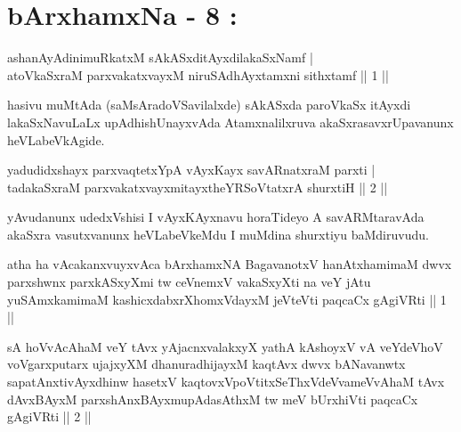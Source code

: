 
\chapter{bArxhamxNa - 8 :}


\begin{shl}
ashanAyAdinimuRkatxM sAkASxditAyxdilakaSxNamf |\\
atoV\s kaSxraM parxvakatxvayxM niruSAdhAyxtamxni sithxtamf \hfill || 1 ||
\end{shl}

\begin{artha}
hasivu muMtAda (saMsAradoVSavilalxde) sAkASxda paroVkaSx itAyxdi lakaSxNavuLaLx upAdhishUnayxvAda Atamxnalilxruva akaSxrasavxrUpavanunx heVLabeVkAgide.
\end{artha}

\begin{shl}
yadudidxshayx parxvaqtetxYpA vAyxKayx savARnatxraM parxti |\\
tadakaSxraM parxvakatxvayxmitayxtheYRSoVtatxrA shurxtiH \hfill || 2 ||
\end{shl}

\begin{artha}
yAvudanunx udedxVshisi I vAyxKAyxnavu horaTideyo A savARMtaravAda akaSxra vasutxvanunx heVLabeVkeMdu I muMdina shurxtiyu baMdiruvudu.
\end{artha}



\begin{kandikeshl}
atha ha vAcakanxvuyxvAca bArxhamxNA BagavanotxV hanAtxhamimaM dwvx parxshwnx parxkASxyXmi tw ceVnemxV vakaSxyXti na veY jAtu yuSAmxkamimaM kashicxdabxrXhomxVdayxM jeVteVti paqcaCx gAgiVRti || 1 ||
\end{kandikeshl}

\begin{kandikeshl}
sA hoVvAcAhaM veY tAvx yAjacnxvalakxyX yathA kAshoyxV vA veYdeVhoV voVgarxputarx ujajxyXM dhanuradhijayxM kaqtAvx dwvx bANavanwtx sapatAnxtivAyxdhinw hasetxV kaqtovxVpoVtitxSeThxVdeVvameVvAhaM tAvx dAvxBAyxM parxshAnxBAyxmupAdasAthxM tw meV bUrxhiVti paqcaCx gAgiVRti || 2 ||
\end{kandikeshl}

